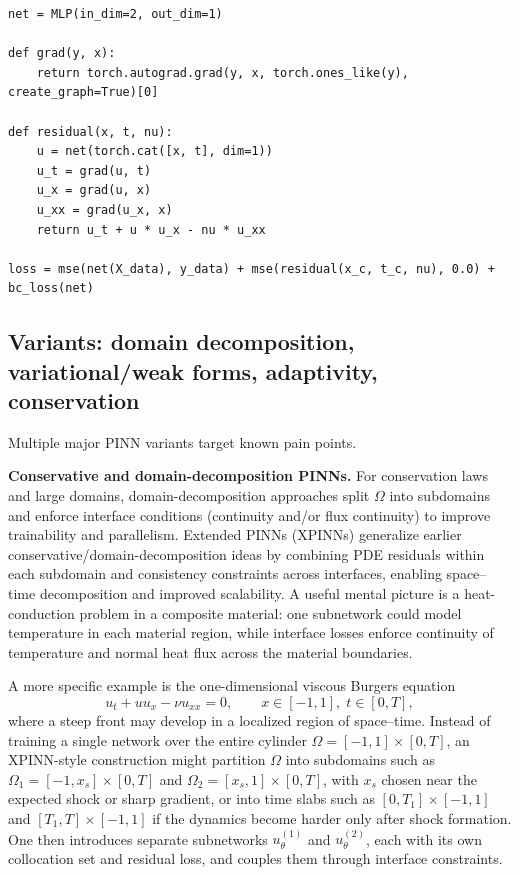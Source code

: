\documentclass[11pt]{article}
\begin{document}
\begin{lstlisting}[style=scimlpython,caption={Minimal PyTorch-style PINN sketch for Burgers or heat-type PDEs.},label={lst:pinn}]
net = MLP(in_dim=2, out_dim=1)

def grad(y, x):
    return torch.autograd.grad(y, x, torch.ones_like(y), create_graph=True)[0]

def residual(x, t, nu):
    u = net(torch.cat([x, t], dim=1))
    u_t = grad(u, t)
    u_x = grad(u, x)
    u_xx = grad(u_x, x)
    return u_t + u * u_x - nu * u_xx

loss = mse(net(X_data), y_data) + mse(residual(x_c, t_c, nu), 0.0) + bc_loss(net)
\end{lstlisting}

    \subsection{Variants: domain decomposition, variational/weak forms, adaptivity, conservation}

    Multiple major PINN variants target known pain points.

    \textbf{Conservative and domain-decomposition PINNs.} For conservation laws and large domains, domain-decomposition approaches split $\Omega$ into subdomains and enforce interface conditions (continuity and/or flux continuity) to improve trainability and parallelism. Extended PINNs (XPINNs) generalize earlier conservative/domain-decomposition ideas by combining PDE residuals within each subdomain and consistency constraints across interfaces, enabling space--time decomposition and improved scalability. A useful mental picture is a heat-conduction problem in a composite material: one subnetwork could model temperature in each material region, while interface losses enforce continuity of temperature and normal heat flux across the material boundaries.

    A more specific example is the one-dimensional viscous Burgers equation
    \begin{equation}
    u_t + u u_x - \nu u_{xx} = 0, \qquad x\in[-1,1], \; t\in[0,T],
    \end{equation}
    where a steep front may develop in a localized region of space--time. Instead of training a single network over the entire cylinder $\Omega=[-1,1]\times[0,T]$, an XPINN-style construction might partition $\Omega$ into subdomains such as $\Omega_1=[-1,x_s]\times[0,T]$ and $\Omega_2=[x_s,1]\times[0,T]$, with $x_s$ chosen near the expected shock or sharp gradient, or into time slabs such as $[0,T_1]\times[-1,1]$ and $[T_1,T]\times[-1,1]$ if the dynamics become harder only after shock formation. One then introduces separate subnetworks $u_{\theta}^{(1)}$ and $u_{\theta}^{(2)}$, each with its own collocation set and residual loss, and couples them through interface constraints.
\end{document}
